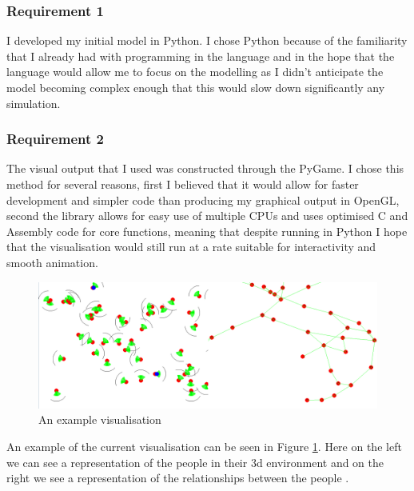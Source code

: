 \documentclass[12pt,a4paper]{article}
\begin{document}
\subsubsection{Requirement 1}
I developed my initial model in Python. I chose Python because of the familiarity that I already had with programming in the language and in the hope that the language would allow me to focus on the modelling as I didn't anticipate the model becoming complex enough that this would slow down significantly any simulation.

\subsubsection{Requirement 2}
The visual output that I used was constructed through the PyGame. I chose this method for several reasons, first I believed that it would allow for faster development and simpler code than producing my graphical output in OpenGL, second the library allows for easy use of multiple CPUs and uses optimised C and Assembly code for core functions, meaning that despite running in Python I hope that the visualisation would still run at a rate suitable for interactivity and smooth animation.

\begin{figure}[htb]
\begin{center}
\caption{An example visualisation}
\label{fig:visualexample}
\includegraphics[width=6in]{screen}
\end{center}
\end{figure}

An example of the current visualisation can be seen in Figure \ref{fig:visualexample}. Here on the left we can see a representation of the people in their 3d environment and on the right we see a representation of the relationships between the people .
\end{document}
